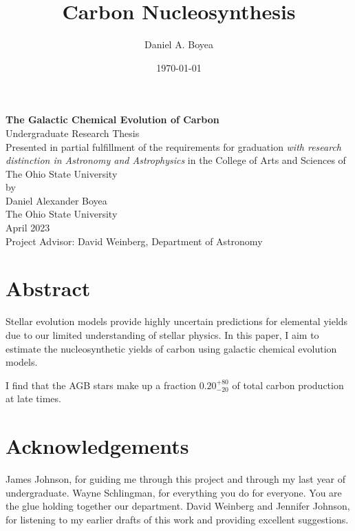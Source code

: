 \documentclass[12pt,oneside]{report}
\title{Carbon Nucleosynthesis}
\author{Daniel A. Boyea}
\date{\today}
\begin{document}


\begin{titlepage}
   \begin{center}
       \vfill
       \textbf{The Galactic Chemical Evolution of Carbon} \\
       [3\baselineskip]
        Undergraduate Research Thesis\\
       [3\baselineskip]
    Presented in partial fulfillment of the requirements for graduation \textit{with research distinction in Astronomy and Astrophysics} in the College of Arts and Sciences of The Ohio State University \\
       [3\baselineskip]
        by \\
       {Daniel Alexander Boyea}\\
       [3\baselineskip]
       The Ohio State University\\
       April 2023\\
       [3\baselineskip]
       Project Advisor: David Weinberg, Department of Astronomy
       \vfill
   \end{center}
\end{titlepage}



\chapter*{Abstract}
Stellar evolution models provide highly uncertain predictions for elemental yields due to our limited understanding of stellar physics. In this paper, I aim to estimate the nucleosynthetic yields of carbon using galactic chemical evolution models. 

I find that the AGB stars make up a fraction $0.20_{-20}^{+80}$ of total carbon production at late times. 

\chapter*{Acknowledgements}

James Johnson, for guiding me through this project and through my last year of undergraduate.
Wayne Schlingman, for everything you do for everyone. You are the glue holding together our department.
David Weinberg and Jennifer Johnson, for listening to my earlier drafts of this work and providing excellent suggestions.
\end{document}
